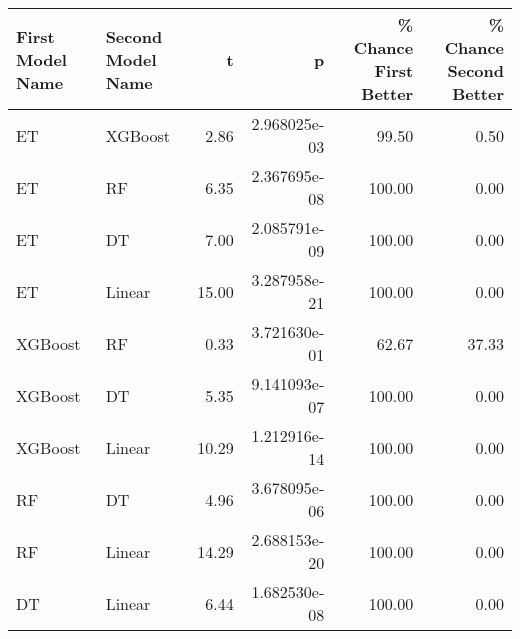 \begin{tabular}{llrrrr}
\toprule
First Model Name & Second Model Name &     t &            p &  \% Chance First Better &  \% Chance Second Better \\
\midrule
              ET &           XGBoost &  2.86 & 2.968025e-03 &                  99.50 &                    0.50 \\
              ET &                RF &  6.35 & 2.367695e-08 &                 100.00 &                    0.00 \\
              ET &                DT &  7.00 & 2.085791e-09 &                 100.00 &                    0.00 \\
              ET &            Linear & 15.00 & 3.287958e-21 &                 100.00 &                    0.00 \\
         XGBoost &                RF &  0.33 & 3.721630e-01 &                  62.67 &                   37.33 \\
         XGBoost &                DT &  5.35 & 9.141093e-07 &                 100.00 &                    0.00 \\
         XGBoost &            Linear & 10.29 & 1.212916e-14 &                 100.00 &                    0.00 \\
              RF &                DT &  4.96 & 3.678095e-06 &                 100.00 &                    0.00 \\
              RF &            Linear & 14.29 & 2.688153e-20 &                 100.00 &                    0.00 \\
              DT &            Linear &  6.44 & 1.682530e-08 &                 100.00 &                    0.00 \\
\bottomrule
\end{tabular}
